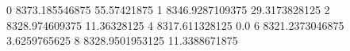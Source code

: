 0 8373.185546875 55.57421875
1 8346.9287109375 29.3173828125
2 8328.974609375 11.36328125
4 8317.611328125 0.0
6 8321.2373046875 3.6259765625
8 8328.9501953125 11.3388671875
